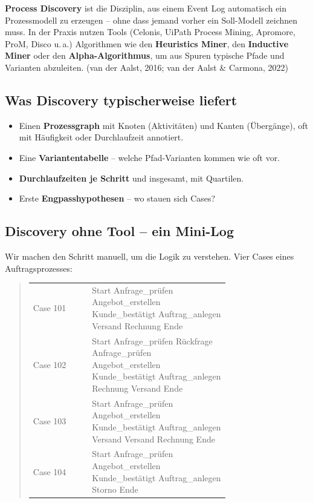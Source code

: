 \documentclass[11pt,a4paper,oneside]{article}
\newcommand{\fachbegriff}[1]{\textbf{#1}}
\newcommand{\quelle}[1]{{\footnotesize\color{lpGray}(#1)}}
\begin{document}
\fachbegriff{Process Discovery} ist die Disziplin, aus einem Event Log automatisch ein Prozessmodell zu erzeugen -- ohne dass jemand vorher ein Soll-Modell zeichnen muss. In der Praxis nutzen Tools (Celonis, UiPath Process Mining, Apromore, ProM, Disco u.\,a.) Algorithmen wie den \fachbegriff{Heuristics Miner}, den \fachbegriff{Inductive Miner} oder den \fachbegriff{Alpha-Algorithmus}, um aus Spuren typische Pfade und Varianten abzuleiten. \quelle{van der Aalst, 2016; van der Aalst \& Carmona, 2022}

\subsection{Was Discovery typischerweise liefert}

\begin{itemize}
  \item Einen \fachbegriff{Prozessgraph} mit Knoten (Aktivitäten) und Kanten (Übergänge), oft mit Häufigkeit oder Durchlaufzeit annotiert.
  \item Eine \fachbegriff{Variantentabelle} -- welche Pfad-Varianten kommen wie oft vor.
  \item \fachbegriff{Durchlaufzeiten je Schritt} und insgesamt, mit Quartilen.
  \item Erste \fachbegriff{Engpasshypothesen} -- wo stauen sich Cases?
\end{itemize}

\subsection{Discovery ohne Tool -- ein Mini-Log}

Wir machen den Schritt manuell, um die Logik zu verstehen. Vier Cases eines Auftragsprozesses:

\begin{quote}
\begin{tabular}{@{}lp{0.7\linewidth}@{}}
\toprule
Case 101 & Start \textrightarrow{} Anfrage\_prüfen \textrightarrow{} Angebot\_erstellen \textrightarrow{} Kunde\_bestätigt \textrightarrow{} Auftrag\_anlegen \textrightarrow{} Versand \textrightarrow{} Rechnung \textrightarrow{} Ende \\
Case 102 & Start \textrightarrow{} Anfrage\_prüfen \textrightarrow{} Rückfrage \textrightarrow{} Anfrage\_prüfen \textrightarrow{} Angebot\_erstellen \textrightarrow{} Kunde\_bestätigt \textrightarrow{} Auftrag\_anlegen \textrightarrow{} Rechnung \textrightarrow{} Versand \textrightarrow{} Ende \\
Case 103 & Start \textrightarrow{} Anfrage\_prüfen \textrightarrow{} Angebot\_erstellen \textrightarrow{} Kunde\_bestätigt \textrightarrow{} Auftrag\_anlegen \textrightarrow{} Versand \textrightarrow{} Versand \textrightarrow{} Rechnung \textrightarrow{} Ende \\
Case 104 & Start \textrightarrow{} Anfrage\_prüfen \textrightarrow{} Angebot\_erstellen \textrightarrow{} Kunde\_bestätigt \textrightarrow{} Auftrag\_anlegen \textrightarrow{} Storno \textrightarrow{} Ende \\
\bottomrule
\end{tabular}
\end{quote}
\end{document}
